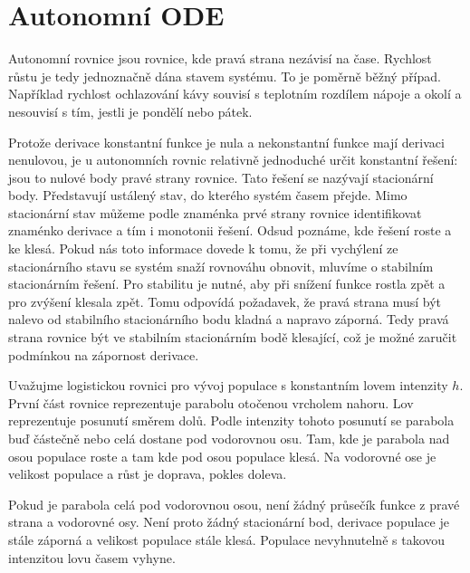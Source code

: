 \documentclass[12pt]{article}
\begin{document}
\section*{Autonomní ODE}

Autonomní rovnice jsou rovnice, kde pravá strana nezávisí na čase. Rychlost růstu je tedy jednoznačně dána stavem systému. To je poměrně běžný případ. Například rychlost ochlazování kávy souvisí s teplotním rozdílem nápoje a okolí a nesouvisí s tím, jestli je pondělí nebo pátek.

Protože derivace konstantní funkce je nula a nekonstantní funkce mají derivaci nenulovou, je u autonomních rovnic relativně jednoduché určit konstantní řešení: jsou to nulové body pravé strany rovnice. Tato řešení se nazývají stacionární body. Představují ustálený stav, do kterého systém časem přejde. Mimo stacionární stav můžeme podle znaménka prvé strany rovnice identifikovat znaménko derivace a tím i monotonii řešení. Odsud poznáme, kde řešení roste a ke klesá. Pokud nás toto informace dovede k tomu, že při vychýlení ze stacionárního stavu se systém snaží rovnováhu obnovit, mluvíme o stabilním stacionárním řešení. Pro stabilitu je nutné, aby při snížení funkce rostla zpět a pro zvýšení klesala zpět. Tomu odpovídá požadavek, že pravá strana musí být nalevo od stabilního stacionárního bodu kladná a napravo záporná. Tedy pravá strana rovnice být ve stabilním stacionárním bodě klesající, což je možné zaručit podmínkou na zápornost derivace.

Uvažujme logistickou rovnici pro vývoj populace s konstantním lovem intenzity $h$. První část rovnice reprezentuje parabolu otočenou vrcholem nahoru. Lov reprezentuje posunutí směrem dolů. Podle intenzity tohoto posunutí se parabola buď částečně nebo celá dostane pod vodorovnou osu. Tam, kde je parabola nad osou populace roste a tam kde pod osou populace klesá. Na vodorovné ose je velikost populace a růst je doprava, pokles doleva.

Pokud je parabola celá pod vodorovnou osou, není žádný průsečík funkce z pravé strana a vodorovné osy. Není proto žádný stacionární bod, derivace populace je stále záporná a velikost populace stále klesá. Populace nevyhnutelně s takovou intenzitou lovu časem vyhyne.
\end{document}
